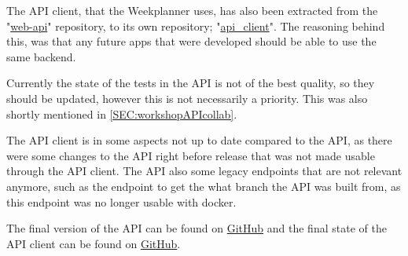 The API client, that the Weekplanner uses, has also been extracted from the "\href{https://github.com/aau-giraf/web-api/tree/2019S4R1}{web-api}" repository, to its own repository; "\href{https://github.com/aau-giraf/api_client/tree/2019S4R1}{api\_client}".
The reasoning behind this, was that any future apps that were developed should be able to use the same backend.

Currently the state of the tests in the API is not of the best quality, so they should be updated, however this is not necessarily a priority.
This was also shortly mentioned in \autoref{SEC:workshopAPIcollab}.

The API client is in some aspects not up to date compared to the API, as there were some changes to the API right before release that was not made usable through the API client.
The API also some legacy endpoints that are not relevant anymore, such as the endpoint to get the what branch the API was built from, as this endpoint was no longer usable with docker.


The final version of the API can be found on \href{https://github.com/aau-giraf/web-api/tree/2019S4R1}{GitHub} and the final state of the API client can be found on \href{https://github.com/aau-giraf/api_client/tree/2019S4R1}{GitHub}.


